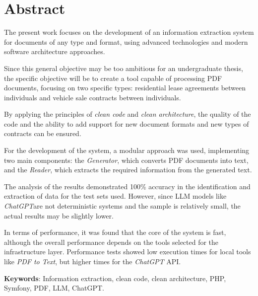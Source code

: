 \newpage
\section*{Abstract}
The present work focuses on the development of an information extraction system for documents of any type and format,
using advanced technologies and modern software architecture approaches.

Since this general objective may be too ambitious for an undergraduate thesis, the specific objective will be to create
a tool capable of processing PDF documents, focusing on two specific types: residential lease agreements between
individuals and vehicle sale contracts between individuals.

By applying the principles of \textit{clean code} and \textit{clean architecture}, the quality of the code and the
ability to add support for new document formats and new types of contracts can be ensured.

For the development of the system, a modular approach was used, implementing two main components: the
\textit{Generator}, which converts PDF documents into text, and the \textit{Reader}, which extracts the required
information from the generated text.

The analysis of the results demonstrated 100\% accuracy in the identification and extraction of data for the test
sets used.
However, since LLM models like \textit{ChatGPT}are not deterministic systems and the sample is relatively small, the
actual results may be slightly lower.

In terms of performance, it was found that the core of the system is fast, although the overall performance depends on
the tools selected for the infrastructure layer.
Performance tests showed low execution times for local tools like \textit{PDF to Text}, but higher times for the
\textit{ChatGPT} API.



\vspace{1cm}

\textbf{Keywords}: Information extraction, clean code, clean architecture, PHP, Symfony, PDF, LLM, ChatGPT.


